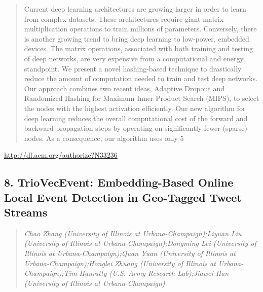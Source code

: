 \documentclass{article}
\begin{document}
\begin{quote}
Current deep learning architectures are growing larger in order to learn from complex datasets. These architectures require giant matrix multiplication operations to train millions of parameters. Conversely, there is another growing trend to bring deep learning to low-power, embedded devices. The matrix operations, associated with both training and testing of deep networks, are very expensive from a computational and energy standpoint. We present a novel hashing-based technique to drastically reduce the amount of computation needed to train and test deep networks. Our approach combines two recent ideas, Adaptive Dropout and Randomized Hashing for Maximum Inner Product Search (MIPS), to select the nodes with the highest activation efficiently. Our new algorithm for deep learning reduces the overall computational cost of the forward and backward propagation steps by operating on significantly fewer (sparse) nodes. As a consequence, our algorithm uses only 5%
\end{quote}

\href{http://dl.acm.org/authorize?N33236}{http://dl.acm.org/authorize?N33236}

\subsection{8. TrioVecEvent: Embedding-Based Online Local Event Detection in Geo-Tagged Tweet Streams}

\begin{quote}
\footnotesize{\textit{Chao Zhang (University of Illinois at Urbana-Champaign);Liyuan Liu (University of Illinois at Urbana-Champaign);Dongming Lei (University of Illinois at Urbana-Champaign);Quan Yuan (University of Illinois at Urbana-Champaign);Honglei Zhuang (University of Illinois at Urbana-Champaign);Tim Hanratty (U.S. Army Research Lab);Jiawei Han (University of Illinois at Urbana-Champaign)}}

\end{quote}
\end{document}
